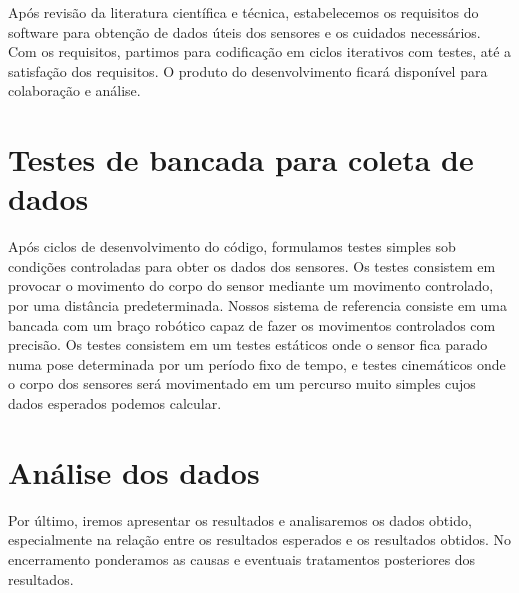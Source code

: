 Após revisão da literatura científica e técnica, estabelecemos os requisitos do software para obtenção de dados úteis dos sensores e os cuidados necessários. Com os requisitos, partimos para codificação em ciclos iterativos com testes, até a satisfação dos requisitos. O produto do desenvolvimento ficará disponível para colaboração e análise.

\section{Testes de bancada para coleta de dados}

Após ciclos de desenvolvimento do código, formulamos testes simples sob condições controladas para obter os dados dos sensores. Os testes consistem em provocar o movimento do corpo do sensor mediante um movimento controlado, por uma distância predeterminada. Nossos sistema de referencia consiste em uma bancada com um braço robótico capaz de fazer os movimentos controlados com precisão. Os testes consistem em um testes estáticos onde o sensor fica parado numa pose determinada por um período fixo de tempo, e testes cinemáticos onde o corpo dos sensores será movimentado em um percurso muito simples cujos dados esperados podemos calcular.

\section{Análise dos dados}

Por último, iremos apresentar os resultados e analisaremos os dados obtido, especialmente na relação entre os resultados esperados e os resultados obtidos. No encerramento ponderamos as causas e eventuais tratamentos posteriores dos resultados.
